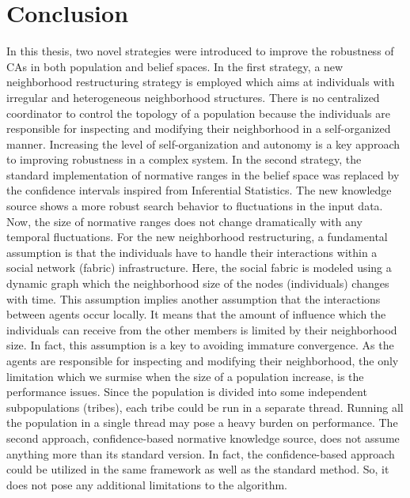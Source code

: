 \label{concl}
\section{Conclusion}
In this thesis, two novel strategies were introduced to improve the robustness of CAs in both population and belief spaces. In the first strategy, a new neighborhood restructuring strategy is employed which aims at individuals with irregular and heterogeneous neighborhood structures. There is no centralized coordinator to control the topology of a population because the individuals are responsible for inspecting and modifying their neighborhood in a self-organized manner. Increasing the level of self-organization and autonomy is a key approach to improving robustness in a complex system.  In the second strategy, the standard implementation of normative ranges in the belief space was replaced by the confidence intervals inspired from Inferential Statistics. The new knowledge source shows a more robust search behavior to fluctuations in the input data. Now, the size of normative ranges does not change dramatically with any temporal fluctuations.\newline
For the new neighborhood restructuring, a fundamental assumption is that the individuals have to handle their interactions within a social network (fabric) infrastructure. Here, the social fabric is modeled using a dynamic graph which the neighborhood size of the nodes (individuals) changes with time. This assumption implies another assumption that the interactions between agents occur locally. It means that the amount of influence which the individuals can receive from the other members is limited by their neighborhood size. In fact, this assumption is a key to avoiding immature convergence. As the agents are responsible for inspecting and modifying their neighborhood, the only limitation which we surmise when the size of a population increase, is the performance issues. Since the population is divided into some independent subpopulations (tribes), each tribe could be run in a separate thread. Running all the population in a single thread may pose a heavy burden on performance.\newline
The second approach, confidence-based normative knowledge source, does not assume anything more than its standard version. In fact, the confidence-based approach could be utilized in the same framework as well as the standard method. So, it does not pose any additional limitations to the algorithm.

